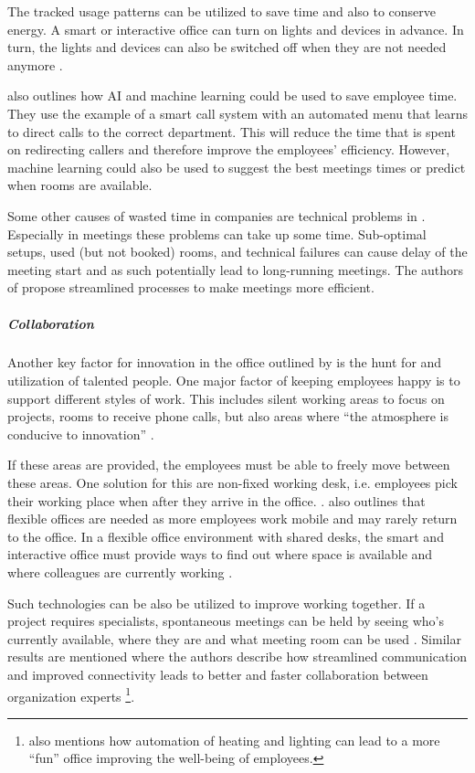 The tracked usage patterns can be utilized to save time and also to conserve energy. A smart or 
interactive office can turn on lights and devices in advance. In turn, the lights and devices can 
also be switched off when they are not needed anymore \cite{hbcommunications}.


\cite{hbcommunications} also outlines how AI and machine learning could be used to save employee 
time. They use the example of a smart call system with an automated menu that learns to direct calls 
to the correct department. This will reduce the time that is spent on redirecting callers and 
therefore improve the employees' efficiency. However, machine learning could also be used to suggest 
the best meetings times or predict when rooms are available.

Some other causes of wasted time in companies are technical problems in \cite{roomzilla3}. 
Especially in meetings these problems can take up some time. Sub-optimal setups, used (but not 
booked) rooms, and technical failures can cause delay of the meeting start and as such potentially 
lead to long-running meetings. The authors of \cite{roomzilla3} propose streamlined processes to 
make meetings more efficient. 

\subparagraph{Collaboration}\label{sec:sda-collaboration}
Another key factor for innovation in the office outlined by \cite{hub13} is the hunt for and 
utilization of talented people. One major factor of keeping employees happy is to support different 
styles of work. This includes silent working areas to focus on projects, rooms to receive phone 
calls, but also areas where ``the atmosphere is conducive to innovation'' \cite{tieto}.

If these areas are provided, the employees must be able to freely move between these areas. One 
solution for this are non-fixed working desk, i.e. employees pick their working place when after 
they arrive in the office. \cite{occupiee}.  also outlines that flexible offices are needed as more 
employees work mobile and may rarely return to the office. In a flexible office environment with 
shared desks, the smart and interactive office must provide ways to find out where space is 
available and where colleagues are currently working \cite{tieto}.

Such technologies can be also be utilized to improve working together. If a project requires 
specialists, spontaneous meetings can be held by seeing who's currently available, where they are 
and what meeting room can be used \cite{tieto}. Similar results are mentioned \cite{hbcommunications} 
where the authors describe how streamlined communication and improved connectivity leads to better 
and faster collaboration between organization experts \footnote{\cite{hbcommunications} also 
mentions how automation of heating and lighting can lead to a more ``fun'' office improving the 
well-being of employees.}.


